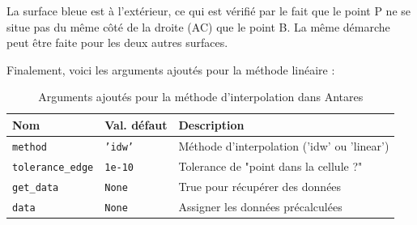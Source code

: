 La surface bleue est à l’extérieur, ce qui est vérifié par le fait que le point P ne se situe pas du même côté de la droite (AC) que le point B.
La même démarche peut être faite pour les deux autres surfaces.

Finalement, voici les arguments ajoutés pour la méthode linéaire :

\label{arguments_ajoutes}
\begin{table}[H]
    \centering
    \begin{tabular}{|l|l|l|}
    \hline
    \textbf{Nom} & \textbf{Val. défaut} & \textbf{Description} \\ \hline %

    \texttt{method} & \texttt{'idw'} & Méthode d'interpolation ('idw' ou 'linear') \\
    \texttt{tolerance\_edge} & \texttt{1e-10} & Tolerance de "point dans la cellule ?" \\
    \texttt{get\_data} & \texttt{None} & True pour récupérer des données \\ 
    \texttt{data} & \texttt{None} & Assigner les données précalculées \\ \hline
    \end{tabular}
    \caption{Arguments ajoutés pour la méthode d'interpolation dans Antares}
    \label{tab:arguments_interpolation2}
\end{table}

